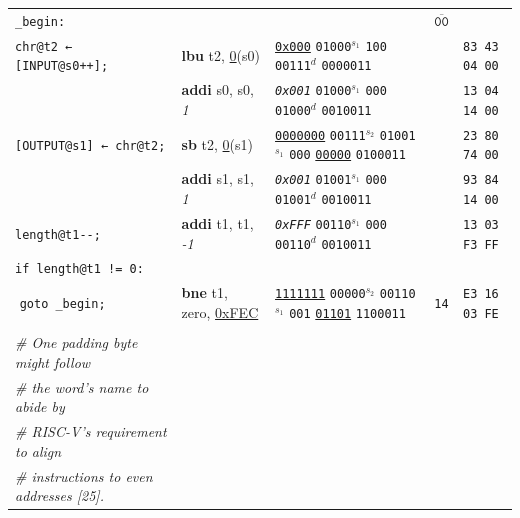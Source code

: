 \documentclass[a4paper,12pt,final]{article}
\makeatletter
\newcommand{\citeprocitem}[2]{\hyper@linkstart{cite}{citeproc_bib_item_#1}#2\hyper@linkend}
\makeatother
\begin{document}
\begin{table}[!htbp]
\begin{adjustwidth}{-1cm}{-1cm}
\begin{center}
\begin{tabular}{l|ll|l|l}
\texttt{\_begin:} &  &  & \(\overline{\texttt{00}}\) & \\[0pt]
\hspace{1.053000em}​\texttt{chr@t2 ← [INPUT@s0++];} & \textbf{lbu} t2, \uline{0}​(s0) & \uline{\texttt{0x000}}                    \texttt{01000}​\(^{s_{1}}\) \texttt{100} \texttt{00111}​\(^{d}\)  \texttt{0000011} &  & \texttt{83 43 04 00}\\[0pt]
 & \textbf{addi} s0, s0, \emph{1} & \emph{\texttt{0x001}}                    \texttt{01000}​\(^{s_{1}}\) \texttt{000} \texttt{01000}​\(^{d}\)  \texttt{0010011} &  & \texttt{13 04 14 00}\\[0pt]
\hspace{1.053000em}​\texttt{[OUTPUT@s1] ← chr@t2;} & \textbf{sb} t2, \uline{0}​(s1) & \uline{\texttt{0000000}} \texttt{00111}​\(^{s_{2}}\) \texttt{01001}​\(^{s_{1}}\) \texttt{000} \uline{\texttt{00000}} \texttt{0100011} &  & \texttt{23 80 74 00}\\[0pt]
 & \textbf{addi} s1, s1, \emph{1} & \emph{\texttt{0x001}}                    \texttt{01001}​\(^{s_{1}}\) \texttt{000} \texttt{01001}​\(^{d}\)  \texttt{0010011} &  & \texttt{93 84 14 00}\\[0pt]
\hspace{1.053000em}​\texttt{length@t1-{}-{};} & \textbf{addi} t1, t1, \emph{-1} & \emph{\texttt{0xFFF}}                    \texttt{00110}​\(^{s_{1}}\) \texttt{000} \texttt{00110}​\(^{d}\)  \texttt{0010011} &  & \texttt{13 03 F3 FF}\\[0pt]
\hspace{1.053000em}​\texttt{if length@t1 != 0:} &  &  &  & \\[0pt]
\hspace{2.106000em}​  \texttt{goto \_begin;} & \textbf{bne} t1, zero, \uline{0xFEC} & \uline{\texttt{1111111}} \texttt{00000}​\(^{s_{2}}\) \texttt{00110}​\(^{s_{1}}\) \texttt{001} \uline{\texttt{01101}} \texttt{1100011} & \texttt{14} & \texttt{E3 16 03 FE}\\[0pt]
 &  &  &  & \\[0pt]
\hspace{1.053000em}​\emph{\# One padding byte might follow} &  &  &  & \\[0pt]
\hspace{1.053000em}​\emph{\# the word's name to abide by} &  &  &  & \\[0pt]
\hspace{1.053000em}​\emph{\# RISC-V's requirement to align} &  &  &  & \\[0pt]
\hspace{1.053000em}​\emph{\# instructions to even addresses \citeprocitem{25}{[25]}.} &  &  &  & \\[0pt]

\end{tabular}
\end{center}
\end{adjustwidth}
\end{table}
\end{document}
